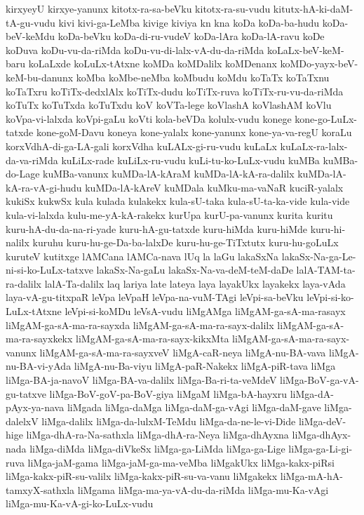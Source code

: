 {kirxyeyU
kirxye-yanunx
kitotx-ra-sa-beVku
kitotx-ra-su-vudu
kitutx-hA-ki-daM-tA-gu-vudu
kivi
kivi-ga-LeMba
kivige
kiviya
kn
kna
koDa
koDa-ba-hudu
koDa-beV-keMdu
koDa-beVku
koDa-di-ru-vudeV
koDa-lAra
koDa-lA-ravu
koDe
koDuva
koDu-vu-da-riMda
koDu-vu-di-lalx-vA-du-da-riMda
koLaLx-beV-keM-baru
koLaLxde
koLuLx-tAtxne
koMDa
koMDalilx
koMDenanx
koMDo-yayx-beV-keM-bu-danunx
koMba
koMbe-neMba
koMbudu
koMdu
koTaTx
koTaTxnu
koTaTxru
koTiTx-dedxlAlx
koTiTx-dudu
koTiTx-ruva
koTiTx-ru-vu-da-riMda
koTuTx
koTuTxda
koTuTxdu
koV
koVTa-lege
koVlashA
koVlashAM
koVlu
koVpa-vi-lalxda
koVpi-gaLu
koVti
kola-beVDa
kolulx-vudu
konege
kone-go-LuLx-tatxde
kone-goM-Davu
koneya
kone-yalalx
kone-yanunx
kone-ya-va-regU
koraLu
korxVdhA-di-ga-LA-gali
korxVdha
kuLALx-gi-ru-vudu
kuLaLx
kuLaLx-ra-lalx-da-va-riMda
kuLiLx-rade
kuLiLx-ru-vudu
kuLi-tu-ko-LuLx-vudu
kuMBa
kuMBa-do-Lage
kuMBa-vanunx
kuMDa-lA-kAraM
kuMDa-lA-kA-ra-dalilx
kuMDa-lA-kA-ra-vA-gi-hudu
kuMDa-lA-kAreV
kuMDala
kuMku-ma-vaNaR
kuciR-yalalx
kukiSx
kukwSx
kula
kulada
kulakekx
kula-sU-taka
kula-sU-ta-ka-vide
kula-vide
kula-vi-lalxda
kulu-me-yA-kA-rakekx
kurUpa
kurU-pa-vanunx
kurita
kuritu
kuru-hA-du-da-na-ri-yade
kuru-hA-gu-tatxde
kuru-hiMda
kuru-hiMde
kuru-hi-nalilx
kuruhu
kuru-hu-ge-Da-ba-lalxDe
kuru-hu-ge-TiTxtutx
kuru-hu-goLuLx
kuruteV
kutitxge
lAMCana
lAMCa-nava
lUq
la
laGu
lakaSxNa
lakaSx-Na-ga-Le-ni-si-ko-LuLx-tatxve
lakaSx-Na-gaLu
lakaSx-Na-va-deM-teM-daDe
lalA-TAM-ta-ra-dalilx
lalA-Ta-dalilx
laq
lariya
late
lateya
laya
layakUkx
layakekx
laya-vAda
laya-vA-gu-titxpaR
leVpa
leVpaH
leVpa-na-vuM-TAgi
leVpi-sa-beVku
leVpi-si-ko-LuLx-tAtxne
leVpi-si-koMDu
leVsA-vudu
liMgAMga
liMgAM-ga-sA-ma-rasayx
liMgAM-ga-sA-ma-ra-sayxda
liMgAM-ga-sA-ma-ra-sayx-dalilx
liMgAM-ga-sA-ma-ra-sayxkekx
liMgAM-ga-sA-ma-ra-sayx-kikxMta
liMgAM-ga-sA-ma-ra-sayx-vanunx
liMgAM-ga-sA-ma-ra-sayxveV
liMgA-caR-neya
liMgA-nu-BA-vava
liMgA-nu-BA-vi-yAda
liMgA-nu-Ba-viyu
liMgA-paR-Nakekx
liMgA-piR-tava
liMga
liMga-BA-ja-navoV
liMga-BA-va-dalilx
liMga-Ba-ri-ta-veMdeV
liMga-BoV-ga-vA-gu-tatxve
liMga-BoV-goV-pa-BoV-giya
liMgaM
liMga-bA-hayxru
liMga-dA-pAyx-ya-nava
liMgada
liMga-daMga
liMga-daM-ga-vAgi
liMga-daM-gave
liMga-dalelxV
liMga-dalilx
liMga-da-lulxM-TeMdu
liMga-da-ne-le-vi-Dide
liMga-deV-hige
liMga-dhA-ra-Na-sathxla
liMga-dhA-ra-Neya
liMga-dhAyxna
liMga-dhAyx-nada
liMga-diMda
liMga-diVkeSx
liMga-ga-LiMda
liMga-ga-Lige
liMga-ga-Li-gi-ruva
liMga-jaM-gama
liMga-jaM-ga-ma-veMba
liMgakUkx
liMga-kakx-piRsi
liMga-kakx-piR-su-valilx
liMga-kakx-piR-su-va-vanu
liMgakekx
liMga-mA-hA-tamxyX-sathxla
liMgama
liMga-ma-ya-vA-du-da-riMda
liMga-mu-Ka-vAgi
liMga-mu-Ka-vA-gi-ko-LuLx-vudu
}

